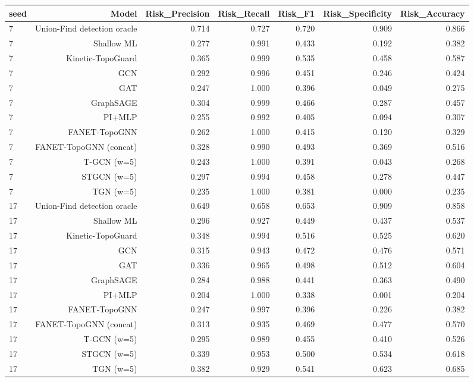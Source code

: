 \begin{tabular}{lrrrrrr}
\toprule
seed & Model & Risk\_Precision & Risk\_Recall & Risk\_F1 & Risk\_Specificity & Risk\_Accuracy \\
\midrule
7 & Union-Find detection oracle & 0.714 & 0.727 & 0.720 & 0.909 & 0.866 \\
7 & Shallow ML & 0.277 & 0.991 & 0.433 & 0.192 & 0.382 \\
7 & Kinetic-TopoGuard & 0.365 & 0.999 & 0.535 & 0.458 & 0.587 \\
7 & GCN & 0.292 & 0.996 & 0.451 & 0.246 & 0.424 \\
7 & GAT & 0.247 & 1.000 & 0.396 & 0.049 & 0.275 \\
7 & GraphSAGE & 0.304 & 0.999 & 0.466 & 0.287 & 0.457 \\
7 & PI+MLP & 0.255 & 0.992 & 0.405 & 0.094 & 0.307 \\
7 & FANET-TopoGNN & 0.262 & 1.000 & 0.415 & 0.120 & 0.329 \\
7 & FANET-TopoGNN (concat) & 0.328 & 0.990 & 0.493 & 0.369 & 0.516 \\
7 & T-GCN (w=5) & 0.243 & 1.000 & 0.391 & 0.043 & 0.268 \\
7 & STGCN (w=5) & 0.297 & 0.994 & 0.458 & 0.278 & 0.447 \\
7 & TGN (w=5) & 0.235 & 1.000 & 0.381 & 0.000 & 0.235 \\
17 & Union-Find detection oracle & 0.649 & 0.658 & 0.653 & 0.909 & 0.858 \\
17 & Shallow ML & 0.296 & 0.927 & 0.449 & 0.437 & 0.537 \\
17 & Kinetic-TopoGuard & 0.348 & 0.994 & 0.516 & 0.525 & 0.620 \\
17 & GCN & 0.315 & 0.943 & 0.472 & 0.476 & 0.571 \\
17 & GAT & 0.336 & 0.965 & 0.498 & 0.512 & 0.604 \\
17 & GraphSAGE & 0.284 & 0.988 & 0.441 & 0.363 & 0.490 \\
17 & PI+MLP & 0.204 & 1.000 & 0.338 & 0.001 & 0.204 \\
17 & FANET-TopoGNN & 0.247 & 0.997 & 0.396 & 0.226 & 0.382 \\
17 & FANET-TopoGNN (concat) & 0.313 & 0.935 & 0.469 & 0.477 & 0.570 \\
17 & T-GCN (w=5) & 0.295 & 0.989 & 0.455 & 0.410 & 0.526 \\
17 & STGCN (w=5) & 0.339 & 0.953 & 0.500 & 0.534 & 0.618 \\
17 & TGN (w=5) & 0.382 & 0.929 & 0.541 & 0.623 & 0.685 \\

\end{tabular}
